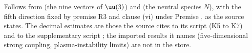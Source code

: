 Follows from  (the nine vectors of $\uu(3)$) and  (the neutral species $N$), with the fifth direction fixed by premise R3 and clause (vi) under Premise , as the source states. The decimal estimates are those the source cites to its script (K5 to K7) and to the supplementary script ; the imported results it names (five-dimensional strong coupling, plasma-instability limits) are not in the store.

